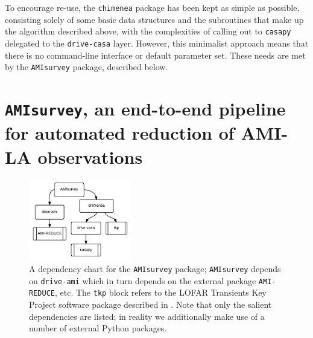 \documentclass[5p,authoryear]{elsarticle}
\begin{document}
To encourage re-use, the \texttt{chimenea} package has been kept as simple as possible, consisting solely of some basic data structures and the subroutines that make up the algorithm described above, with the complexities of calling out to \texttt{casapy} delegated to the \texttt{drive-casa} layer. 
However, this minimalist approach means that there is no command-line interface or default parameter set. 
These needs are met by the \texttt{AMIsurvey} package, described below.


% 
% 
\section{\texttt{AMIsurvey}, an end-to-end pipeline for automated reduction of AMI-LA observations}
\label{sec:amisurvey} 
\begin{figure}
\begin{center}  
  \includegraphics[width=0.4\textwidth]{../figures/amisurvey-deps}
  \caption[Dependency chart for the \texttt{AMIsurvey} package.]{%
A dependency chart for the \texttt{AMIsurvey} package; \texttt{AMIsurvey} depends on \texttt{drive-ami}  which in turn depends on the external package \texttt{AMI-REDUCE}, etc.
The \texttt{tkp} block refers to the LOFAR Transients Key Project software package \citep{Trap2014} described in \cite{Swinbank2015}.
Note that only the salient dependencies are listed; in reality we additionally make use of a 
number of external Python packages.
\label{fig:amisurvey-deps}
} 
\end{center} 
\end{figure}
\end{document}
